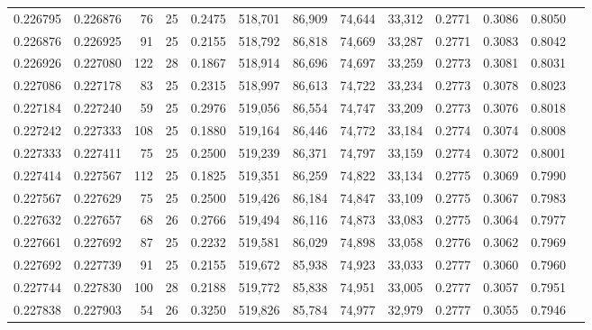 \begin{tabular}{rrrrrrrrrrrrr}
0.226795 & 0.226876 &  76 &  25 &                                     0.2475 & 518,701 &  86,909 &  74,644 &  33,312 & 0.2771 & 0.3086 & 0.8050 \\
0.226876 & 0.226925 &  91 &  25 &                                     0.2155 & 518,792 &  86,818 &  74,669 &  33,287 & 0.2771 & 0.3083 & 0.8042 \\
0.226926 & 0.227080 & 122 &  28 &                                     0.1867 & 518,914 &  86,696 &  74,697 &  33,259 & 0.2773 & 0.3081 & 0.8031 \\
0.227086 & 0.227178 &  83 &  25 &                                     0.2315 & 518,997 &  86,613 &  74,722 &  33,234 & 0.2773 & 0.3078 & 0.8023 \\
0.227184 & 0.227240 &  59 &  25 &                                     0.2976 & 519,056 &  86,554 &  74,747 &  33,209 & 0.2773 & 0.3076 & 0.8018 \\
0.227242 & 0.227333 & 108 &  25 &                                     0.1880 & 519,164 &  86,446 &  74,772 &  33,184 & 0.2774 & 0.3074 & 0.8008 \\
0.227333 & 0.227411 &  75 &  25 &                                     0.2500 & 519,239 &  86,371 &  74,797 &  33,159 & 0.2774 & 0.3072 & 0.8001 \\
0.227414 & 0.227567 & 112 &  25 &                                     0.1825 & 519,351 &  86,259 &  74,822 &  33,134 & 0.2775 & 0.3069 & 0.7990 \\
0.227567 & 0.227629 &  75 &  25 &                                     0.2500 & 519,426 &  86,184 &  74,847 &  33,109 & 0.2775 & 0.3067 & 0.7983 \\
0.227632 & 0.227657 &  68 &  26 &                                     0.2766 & 519,494 &  86,116 &  74,873 &  33,083 & 0.2775 & 0.3064 & 0.7977 \\
0.227661 & 0.227692 &  87 &  25 &                                     0.2232 & 519,581 &  86,029 &  74,898 &  33,058 & 0.2776 & 0.3062 & 0.7969 \\
0.227692 & 0.227739 &  91 &  25 &                                     0.2155 & 519,672 &  85,938 &  74,923 &  33,033 & 0.2777 & 0.3060 & 0.7960 \\
0.227744 & 0.227830 & 100 &  28 &                                     0.2188 & 519,772 &  85,838 &  74,951 &  33,005 & 0.2777 & 0.3057 & 0.7951 \\
0.227838 & 0.227903 &  54 &  26 &                                     0.3250 & 519,826 &  85,784 &  74,977 &  32,979 & 0.2777 & 0.3055 & 0.7946 \\

\end{tabular}
